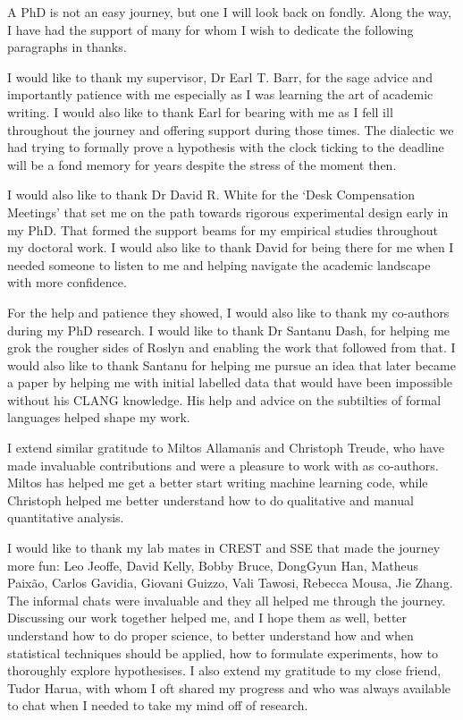 A PhD is not an easy journey, but one I will look back on fondly. Along the way,
I have had the support of many for whom I wish to dedicate the following
paragraphs in thanks.

I would like to thank my supervisor, Dr Earl T. Barr, for the sage advice and
importantly patience with me especially as I was learning the art of
academic writing. I would also like to thank Earl for bearing with me as I fell
ill throughout the journey and offering support during those times. The
dialectic we had trying to formally prove a hypothesis with the clock ticking to
the deadline will be a fond memory for years despite the stress of the moment
then.

I would also like to thank Dr David R. White for the `Desk Compensation
Meetings' that set me on the path towards rigorous experimental design early in
my PhD. That formed the support beams for my empirical studies throughout my
doctoral work. I would also like to thank David for being there for me when I
needed someone to listen to me and helping navigate the academic landscape with
more confidence.

For the help and patience they showed, I would also like to thank my co-authors
during my PhD research. I would like to thank Dr Santanu Dash, for helping me
grok the rougher sides of Roslyn and enabling the work that followed from that.
I would also like to thank Santanu for helping me pursue an idea that later
became a paper by helping me with initial labelled data that would have been
impossible without his CLANG knowledge. His help and advice on the subtilties of
formal languages helped shape my work.

I extend similar gratitude to Miltos Allamanis and Christoph Treude, who have
made invaluable contributions and were a pleasure to work with as co-authors.
Miltos has helped me get a better start writing machine learning code, while
Christoph helped me better understand how to do qualitative and manual
quantitative analysis.

I would like to thank my lab mates in CREST and SSE that made the journey more
fun: Leo Jeoffe, David Kelly, Bobby Bruce, DongGyun Han, Matheus Paix\~ao,
Carlos Gavidia, Giovani Guizzo, Vali Tawosi, Rebecca Mousa, Jie Zhang. The
informal chats were invaluable and they all helped me through the journey.
Discussing our work together helped me, and I hope them as well, better
understand how to do proper science, to better understand how and when
statistical techniques should be applied, how to formulate experiments, how to
thoroughly explore hypothesises. I also extend my gratitude to my close friend,
Tudor Harua, with whom I oft shared my progress and who was always
available to chat when I needed to take my mind off of research.

